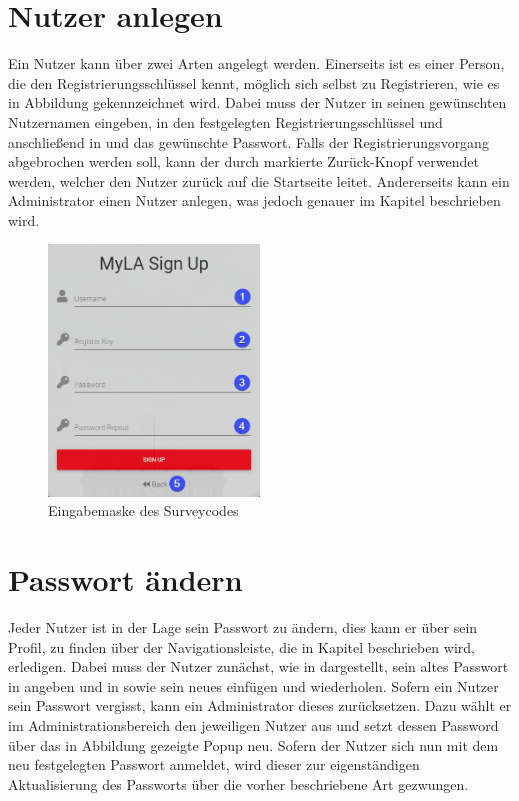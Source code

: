 \section{Nutzer anlegen}
\label{ssec:NutzerAnlegen}

Ein Nutzer kann über zwei Arten angelegt werden.
Einerseits ist es einer Person, die den Registrierungsschlüssel kennt, möglich sich selbst zu Registrieren, wie es in Abbildung  gekennzeichnet wird.
Dabei muss der Nutzer in \desOne seinen gewünschten Nutzernamen eingeben, in \desTwo den festgelegten Registrierungsschlüssel und anschließend in \desThree und \desFour das gewünschte Passwort.
Falls der Registrierungsvorgang abgebrochen werden soll, kann der durch \desFive markierte Zurück-Knopf verwendet werden, welcher den Nutzer zurück auf die Startseite leitet.
Andererseits kann ein Administrator einen Nutzer anlegen, was jedoch genauer im Kapitel  beschrieben wird.

\begin{figure}[H]
	\centering
	\includegraphics[width=0.5\textwidth, keepaspectratio]{img/guide/Register.png}
	\captionsetup{justification=centering, format=plain}
	\caption[Eingabemaske Registrierung]{Eingabemaske des Surveycodes \\\quelleScreenshot}
	\label{fig:Register}
\end{figure}

\section{Passwort ändern}

Jeder Nutzer ist in der Lage sein Passwort zu ändern, dies kann er über sein Profil, zu finden über der Navigationsleiste, die in Kapitel  beschrieben wird, erledigen.
Dabei muss der Nutzer zunächst, wie in  dargestellt, sein altes Passwort in \desOne angeben und in \desTwo sowie \desThree sein neues einfügen und wiederholen.
Sofern ein Nutzer sein Passwort vergisst, kann ein Administrator dieses zurücksetzen.
Dazu wählt er im Administrationsbereich  den jeweiligen Nutzer aus und setzt dessen Password über das in Abbildung  gezeigte Popup neu.
Sofern der Nutzer sich nun mit dem neu festgelegten Passwort anmeldet, wird dieser zur eigenständigen Aktualisierung des Passworts über die vorher beschriebene Art gezwungen.


